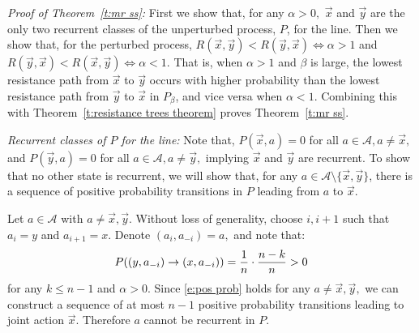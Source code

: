 

\noindent\emph{Proof of Theorem~\ref{t:mr ss}: }\label{a:proof mr ss}
First we show that, for any $\alpha >0,$ $\vec{x}$ and $ \vec{y}$ are the only two recurrent classes of the unperturbed process, $P$, for the line. Then we show that, for the perturbed process, 
$R(\vec{x}, \vec{y}) < R( \vec{y},\vec{x}) \iff \alpha >1$ 
and 
$R( \vec{y},\vec{x}) < R(\vec{x}, \vec{y}) \iff \alpha <1.$
That is, when $\alpha >1$ and $\beta$ is large, the lowest resistance path from $\vec{x}$ to $ \vec{y}$ occurs with higher probability than the lowest resistance path from $ \vec{y}$ to $\vec{x}$ in $P_\beta$, and vice versa when $\alpha <1.$ 
 Combining this with Theorem~\ref{t:resistance trees theorem} proves Theorem~\ref{t:mr ss}.

\noindent\emph{Recurrent classes of $P$ for the line:} Note that, 
$P(\vec{x},a) = 0$ for all $a\in \mathcal{A}, a\neq \vec{x},$
and
$P( \vec{y},a) = 0$ for all $a\in \mathcal{A}, a\neq  \vec{y},$
implying $\vec{x}$ and $ \vec{y}$ are recurrent. To show that no other state is recurrent, we will show that, for any $a\in \mathcal{A}\setminus \{\vec{x}, \vec{y}\}$, there is a sequence of positive probability transitions in $P$ leading from $a$ to $\vec{x}$.

Let $a\in\mathcal{A}$ with $a\neq \vec{x}, \vec{y}.$ Without loss of generality, choose $i,i+1$ such that $a_i = y$ and $a_{i+1} = x.$ Denote $(a_i,a_{-i}) = a,$ and note that:
\begin{equation}\label{e:pos prob}
P((y,a_{-i})\to (x,a_{-i})) = {1\over n}\cdot{n-k\over n}>0
\end{equation}
for any $k\leq n-1$ and $\alpha >0$.
Since \eqref{e:pos prob} holds for any $a\neq \vec{x},\vec{y},$ we can construct a sequence of at most $n-1$ positive probability transitions leading to joint action $\vec{x}$. Therefore $a$ cannot be recurrent in $P.$


